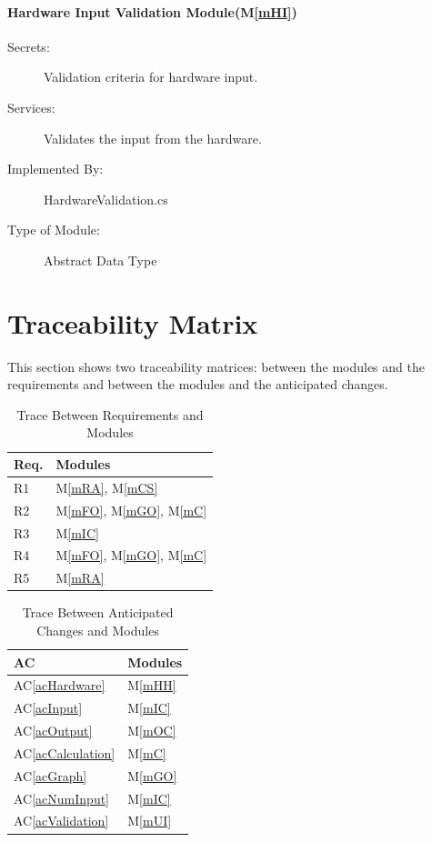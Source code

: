 \documentclass[12pt, titlepage]{article}
\newcommand{\acref}[1]{AC\ref{#1}}
\newcommand{\mref}[1]{M\ref{#1}}
\begin{document}
\paragraph{Hardware Input Validation Module(\mref{mHI})}
\begin{description}
  \item[Secrets:] Validation criteria for hardware input.
  \item[Services:] Validates the input from the hardware.
  \item[Implemented By:] HardwareValidation.cs 
  \item[Type of Module:] Abstract Data Type
\end{description}

\section{Traceability Matrix} \label{SecTM}

This section shows two traceability matrices: between the modules and the
requirements and between the modules and the anticipated changes.

\begin{table}[H]
\centering
\begin{tabular}{p{} p{}}
\toprule
\textbf{Req.} & \textbf{Modules}\\
\midrule
R1 & \mref{mRA}, \mref{mCS}\\
R2 & \mref{mFO}, \mref{mGO}, \mref{mC}\\
R3 & \mref{mIC}\\
R4 & \mref{mFO}, \mref{mGO}, \mref{mC}\\
R5 & \mref{mRA}\\
\bottomrule
\end{tabular}
\caption{Trace Between Requirements and Modules}
\label{TblRT}
\end{table}

\begin{table}[H]
\centering
\begin{tabular}{p{} p{}}
\toprule
\textbf{AC} & \textbf{Modules}\\
\midrule
\acref{acHardware} & \mref{mHH}\\
\acref{acInput} & \mref{mIC}\\
\acref{acOutput} & \mref{mOC}\\
\acref{acCalculation} & \mref{mC}\\
\acref{acGraph} & \mref{mGO}\\
\acref{acNumInput} & \mref{mIC}\\
\acref{acValidation} & \mref{mUI}\\
\bottomrule
\end{tabular}
\caption{Trace Between Anticipated Changes and Modules}
\label{TblACT}
\end{table}
\end{document}
